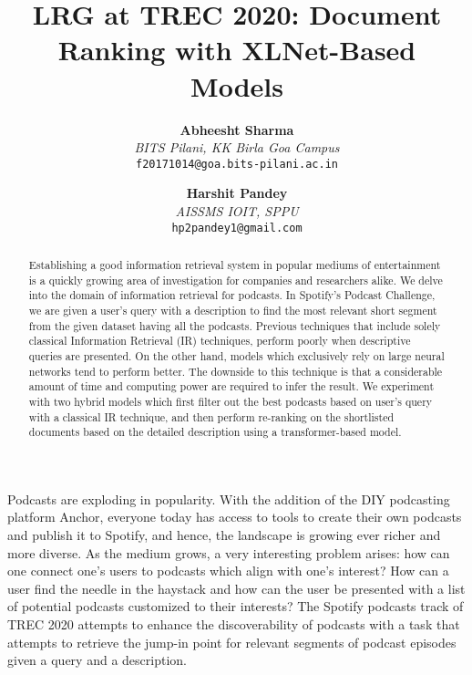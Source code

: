 \documentclass[10pt,twocolumn]{article}
\begin{document}
\title{LRG at TREC 2020: Document Ranking with XLNet-Based Models}



\author{
  \textbf{Abheesht Sharma}\\
 \textit{BITS Pilani, KK Birla Goa Campus}\\
  \texttt{\small f20171014@goa.bits-pilani.ac.in} \\
   \and
 \textbf{Harshit Pandey} \\
  \textit{AISSMS IOIT, SPPU}\\
  \texttt{\small hp2pandey1@gmail.com} \\
}

\pagestyle{plain}
\maketitle

\begin{abstract}
Establishing a good information retrieval system in popular mediums of entertainment is a quickly growing area of investigation for companies and researchers alike. We delve into the domain of information retrieval for podcasts. In Spotify’s Podcast Challenge, we are given a user’s query with a description to find the most relevant short segment from the given dataset having all the podcasts. Previous techniques that include solely classical Information Retrieval (IR) techniques, perform poorly when descriptive queries are presented. On the other hand, models which exclusively rely on large neural networks tend to perform better. The downside to this technique is that a considerable amount of time and computing power are required to infer the result. We experiment with two hybrid models which first filter out the best podcasts based on user's query with a classical IR technique, and then perform re-ranking on the shortlisted documents based on the detailed description using a transformer-based model.
\end{abstract}

Podcasts are exploding in popularity. With the addition of the DIY podcasting platform Anchor, everyone today has access to tools to create their own podcasts and publish it to Spotify, and hence, the landscape is growing ever richer and more diverse. As the medium grows, a very interesting problem arises: how can one connect one's users to podcasts which align with one's interest? How can a user find the needle in the haystack and how can the user be presented with a list of potential podcasts customized to their interests? The Spotify podcasts track of TREC 2020 attempts to enhance the discoverability of podcasts with a task that attempts to retrieve the jump-in point for relevant segments of podcast episodes given a query and a description.
\end{document}
